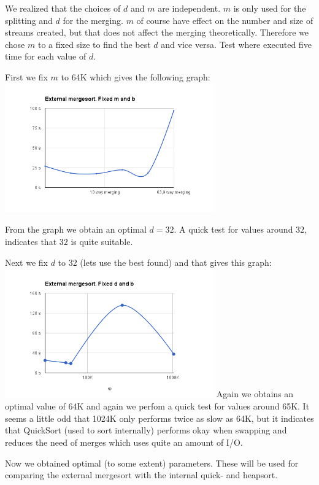 We realized that the choices of $d$ and $m$ are independent. $m$ is only used for the splitting and $d$ for the merging. $m$ of course have effect on the number and size of streams created, but that does not affect the merging theoretically. Therefore we chose $m$ to a fixed size to find the best $d$ and vice versa. Test where executed five time for each value of $d$.

First we fix $m$ to 64K which gives the following graph:
\includegraphics[width=90mm]{graphics/MergeSortFixedM.png}

From the graph we obtain an optimal $d = 32$. A quick test for values around $32$, indicates that $32$ is quite suitable.

Next we fix $d$ to 32 (lets use the best found) and that gives this graph:
\includegraphics[width=90mm]{graphics/MergeSortFixedD.png}
Again we obtains an optimal value of 64K and again we perfom a quick test for values around 65K. It seems a little odd that 1024K only performs twice as slow as 64K, but it indicates that QuickSort (used to sort internally) performs okay when swapping and reduces the need of merges which uses quite an amount of I/O.

Now we obtained optimal (to some extent) parameters. These will be used for comparing the external mergesort with the internal quick- and heapsort.



